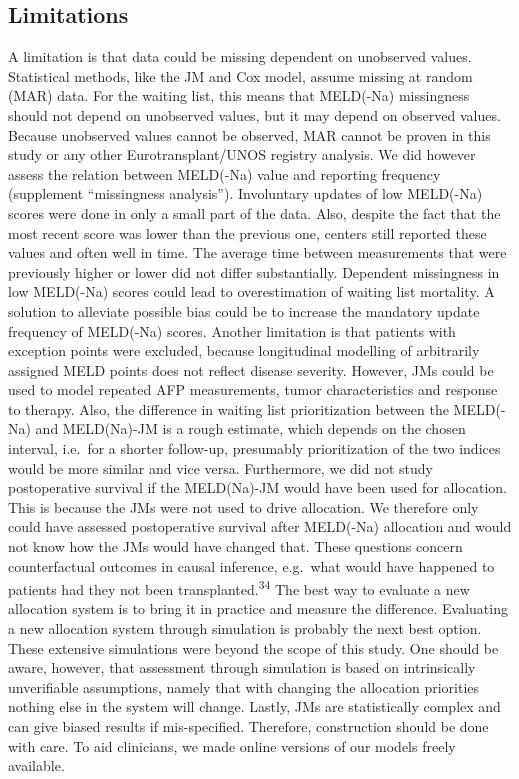 \documentclass[11pt,english,]{book} %
\begin{document}
\hypertarget{limitations-2}{%
\subsection*{Limitations}\label{limitations-2}}

A limitation is that data could be missing dependent on unobserved values. Statistical methods, like the JM and Cox model, assume missing at random (MAR) data. For the waiting list, this means that MELD(-Na) missingness should not depend on unobserved values, but it may depend on observed values. Because unobserved values cannot be observed, MAR cannot be proven in this study or any other Eurotransplant/UNOS registry analysis. We did however assess the relation between MELD(-Na) value and reporting frequency (supplement ``missingness analysis''). Involuntary updates of low MELD(-Na) scores were done in only a small part of the data. Also, despite the fact that the most recent score was lower than the previous one, centers still reported these values and often well in time. The average time between measurements that were previously higher or lower did not differ substantially. Dependent missingness in low MELD(-Na) scores could lead to overestimation of waiting list mortality. A solution to alleviate possible bias could be to increase the mandatory update frequency of MELD(-Na) scores. Another limitation is that patients with exception points were excluded, because longitudinal modelling of arbitrarily assigned MELD points does not reflect disease severity. However, JMs could be used to model repeated AFP measurements, tumor characteristics and response to therapy. Also, the difference in waiting list prioritization between the MELD(-Na) and MELD(Na)-JM is a rough estimate, which depends on the chosen interval, i.e.~for a shorter follow-up, presumably prioritization of the two indices would be more similar and vice versa. Furthermore, we did not study postoperative survival if the MELD(Na)-JM would have been used for allocation. This is because the JMs were not used to drive allocation. We therefore only could have assessed postoperative survival after MELD(-Na) allocation and would not know how the JMs would have changed that. These questions concern counterfactual outcomes in causal inference, e.g.~what would have happened to patients had they not been transplanted.\textsuperscript{34} The best way to evaluate a new allocation system is to bring it in practice and measure the difference. Evaluating a new allocation system through simulation is probably the next best option. These extensive simulations were beyond the scope of this study. One should be aware, however, that assessment through simulation is based on intrinsically unverifiable assumptions, namely that with changing the allocation priorities nothing else in the system will change. Lastly, JMs are statistically complex and can give biased results if mis-specified. Therefore, construction should be done with care. To aid clinicians, we made online versions of our models freely available.
\end{document}
